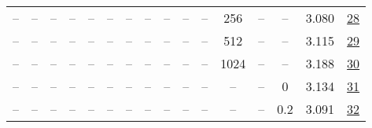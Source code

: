 \begin{table}[H]
\begin{tabular}{cccccccccccccccc}
-- & -- & -- & -- & -- & -- & -- & -- & -- & -- & -- & 256 & -- & -- & 3.080 & \href{https://wandb.ai/stanford-mercury/optimizer-scaling/runs/sweep-520m-10B-muona62a25lr0.008-wd0.1-minlr0-warmup0-b10.8-b20.-97f566}{28} \\
-- & -- & -- & -- & -- & -- & -- & -- & -- & -- & -- & 512 & -- & -- & 3.115 & \href{https://wandb.ai/stanford-mercury/optimizer-scaling/runs/sweep-520m-10B-muon3fa686lr0.008-wd0.1-minlr0-warmup0-b10.8-b20.-2400de}{29} \\
-- & -- & -- & -- & -- & -- & -- & -- & -- & -- & -- & 1024 & -- & -- & 3.188 & \href{https://wandb.ai/stanford-mercury/optimizer-scaling/runs/sweep-520m-10B-muon1aeff4lr0.008-wd0.1-minlr0-warmup0-b10.8-b20.-7d6c1a}{30} \\
-- & -- & -- & -- & -- & -- & -- & -- & -- & -- & -- & -- & -- & 0 & 3.134 & \href{https://wandb.ai/stanford-mercury/optimizer-scaling/runs/sweep-520m-10B-muonde6262lr0.008-wd0-minlr0-warmup0-b10.8-b20.98-beffd0}{31} \\
-- & -- & -- & -- & -- & -- & -- & -- & -- & -- & -- & -- & -- & 0.2 & 3.091 & \href{https://wandb.ai/stanford-mercury/optimizer-scaling/runs/sweep-520m-10B-muon3e335flr0.008-wd0.2-minlr0-warmup0-b10.8-b20.-b2ac88}{32} \\
\bottomrule
\end{tabular}
\end{table}

